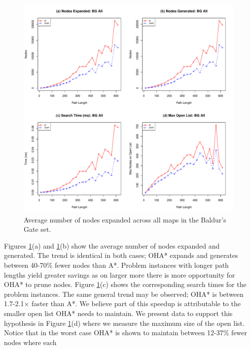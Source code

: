 \begin{figure}[htbp]
	\vspace{-2pt}
	\begin{center}
		       \includegraphics[scale=0.35, trim = 20mm 17mm 20mm 5mm]{diagrams/bg_effort.pdf}
	\end{center}
	\caption{Average number of nodes expanded across all maps in the Baldur's Gate set.}
	\label{fig-searcheffort}
\end{figure}
\par \indent
Figures \ref{fig-searcheffort}(a) and \ref{fig-searcheffort}(b)  show the average number of 
nodes expanded and generated. 
The trend is identical in both cases; OHA* expands and generates between 40-70\% fewer nodes than A*.
Problem instances with longer path lengths yield greater savings as on larger more there is more 
opportunity for OHA* to prune nodes. 
Figure \ref{fig-searcheffort}(c) shows the corresponding search times for the problem instances. 
The same general trend may be observed; OHA* is between 1.7-2.1$\times$ faster than A*.
We believe part of this speedup is attributable to the smaller open list OHA* needs to maintain.
We present data to support this hypothesis in Figure \ref{fig-searcheffort}(d) where we measure 
the maximum size of the open list. 
Notice that in the worst case OHA* is shown to maintain between 12-37\% fewer nodes where each
